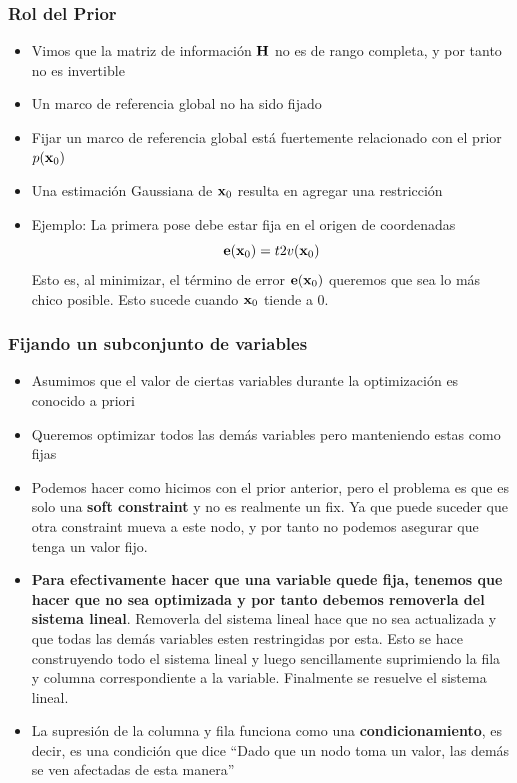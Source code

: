 \begin{frame}
    \frametitle{Rol del Prior}
    
    \begin{itemize}
        \item Vimos que la matriz de información $\boldsymbol{\mathbf{H}}$ no es de rango completa, y por tanto no es invertible
        \item Un marco de referencia global no ha sido fijado
        \item Fijar un marco de referencia global está fuertemente relacionado con el prior $p(\boldsymbol{\mathbf{x}}_{0})$
        \item Una estimación Gaussiana de $\boldsymbol{\mathbf{x}}_{0}$ resulta en agregar una restricción
        \item Ejemplo: La primera pose debe estar fija en el origen de coordenadas
        \begin{equation*}
            \boldsymbol{\mathbf{e}}(\boldsymbol{\mathbf{x}}_{0}) = t2v(\boldsymbol{\mathbf{x}}_{0})
        \end{equation*}
        Esto es, al minimizar, el término de error $\boldsymbol{\mathbf{e}}(\boldsymbol{\mathbf{x}}_{0})$ queremos que sea lo más chico posible. Esto sucede cuando $\boldsymbol{\mathbf{x}}_{0}$ tiende a 0.
    \end{itemize}
    
\end{frame}

\begin{frame}
    \frametitle{Fijando un subconjunto de variables}
    
    \begin{itemize}
        \item Asumimos que el valor de ciertas variables durante la optimización es conocido a priori
        \item Queremos optimizar todos las demás variables pero manteniendo estas como fijas
        \item Podemos hacer como hicimos con el prior anterior, pero el problema es que es solo una {\bf soft constraint} y no es realmente un fix. Ya que puede suceder que otra constraint mueva a este nodo, y por tanto no podemos asegurar que tenga un valor fijo.
        \item \textbf{Para efectivamente hacer que una variable quede fija, tenemos que hacer que no sea optimizada y por tanto debemos removerla del sistema lineal}. Removerla del sistema lineal hace que no sea actualizada y que todas las demás variables esten restringidas por esta. Esto se hace construyendo todo el sistema lineal y luego sencillamente suprimiendo la fila y columna correspondiente a la variable. Finalmente se resuelve el sistema lineal.
        \item La supresión de la columna y fila funciona como una {\bf condicionamiento}, es decir, es una condición que dice ``Dado que un nodo toma un valor, las demás se ven afectadas de esta manera''
        
    \end{itemize}
    
\end{frame}

